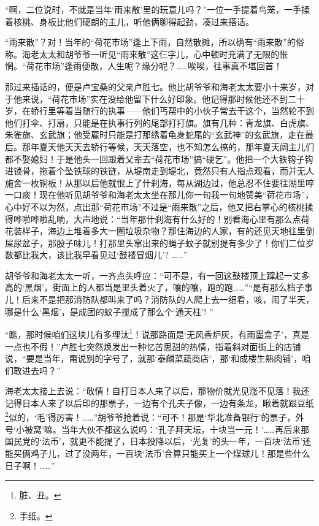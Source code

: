 \par “啊，二位说时，不就是当年‘雨来散’里的玩意儿吗？”一位一手提着鸟笼，一手揉着核桃、身板比他们硬朗的主儿，听他俩聊得起劲，凑过来搭话。
\par “雨来散”？对！当年的“荷花市场”逢上下雨，自然散摊，所以确有“雨来散”的俗称。海老太太和胡爷爷一听见“雨来散”这仨字儿，心中顿时充满了无限的怅惘。“荷花市场”逢雨便散，人生呢？缘分呢？……唉唉，往事真不堪回首！
\par 那过来插话的，便是卢宝桑的父亲卢胜七。他比胡爷爷和海老太太要小十来岁，对于他来说，“荷花市场”实在没给他留下什么好印象。他记得那时候他还不到二十岁，在轿行里等着当随行的执事——他们丐帮中的小伙子常去干这个，当然轮不到他们打伞、打扇，只能是在执事行列的尾部打打旗。旗有几种：青龙旗、白虎旗、朱雀旗、玄武旗；他受雇时只能是打那绣着龟身蛇尾的“玄武神”的玄武旗，走在最后。那年夏天他天天去轿行等候，天天落空，也不知怎么搞的，那年夏天阔主儿们都不娶媳妇！于是他头一回跟着父辈去“荷花市场”搞“硬乞”。他把一个大铁钩子钩进锁骨，拖着个坠铁球的铁链，从堤南走到堤北，竟然只有人指点观看，而并无人施舍一枚铜板！从那以后他就恨上了什刹海，每从湖边过，他总忍不住要往湖里啐一口痰！现在他听见胡爷爷和海老太太坐在那儿你一句我一句地赞美“荷花市场”，心中好不以为然，点出那“荷花市场”不过是“雨来散”之后，他又把右掌心的核桃揉得哗啦哗啦乱响，大声地说：“当年那什刹海有什么好的！别看海心里有那么点荷花装样子，海边上堆着多大一圈垃圾杂物？那住海边的人家，有的还见天地往里倒屎尿盆子，那股子味儿！打那里头窜出来的蝇子蚊子就别提有多少了！你们二位岁数都比我大，该比我早看见过‘鼓楼冒烟儿’? ……”
\par 胡爷爷和海老太太一听，一齐点头呼应：“可不是，有一回这鼓楼顶上蹿起一丈多高的‘黑烟’，街面上的人都当是里头着火了，嚷的嚷，跑的跑……”“是有那么档子事儿！后来不是把那消防队都叫来了吗？消防队的人爬上去一细看，咳，闹了半天，哪是什么‘黑烟’，是成团的蚊子搅成了那么个‘通天柱’! ”
\par “瞧，那时候咱们这块儿有多埋汰\footnote{脏、丑。}！说那路面是‘无风香炉灰，有雨墨盒子’，真是一点也不假！”卢胜七突然焕发出一种忆苦思甜的热情，指着斜对面街上的店铺说，“要是当年，甭说别的字号了，就那‘泰麟菜蔬商店’，那‘和成楼生熟肉铺’，咱们敢进去吗？”
\par 海老太太接上去说：“敢情！自打日本人来了以后，那物价就光见涨不见落！我还记得日本人来了以后印的那票子，一边有个孔夫子像，一边有条龙，瞅着就跟豆纸\footnote{手纸。}似的，‘毛’得厉害！……”胡爷爷抢着说：“可不！那是‘华北准备银行’的票子，外号‘小被窝’嘛。当年大伙不都这么说吗：‘孔子拜天坛，十块当一元！'……再后来那国民党的‘法币’，就更不能提了，日本投降以后，‘光复’的头一年，一百块‘法币’还能买俩鸡子儿，过了没两年，一百块‘法币’合算只能买上一个煤球儿！那是些什么日子啊！……”
